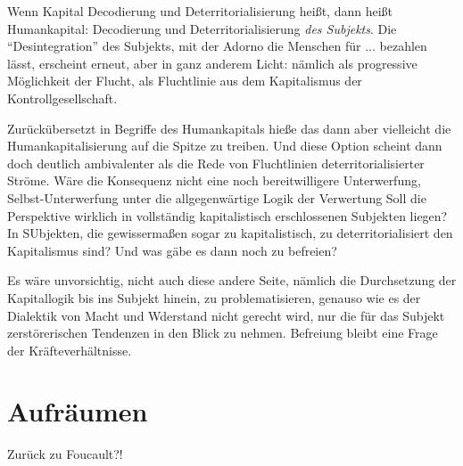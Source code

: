 \documentclass[12pt,
               DIV13,
               paper=a4,
               twoside=false,
               onehalfspacing,
               bibliography=totoc,
               toc=graduated,
               draft,
               ]{scrartcl}
\newcommand{\worries}[1]{\ifdraft{\textcolor{blue}{\texttt{(#1)}}}{}}
\begin{document}
Wenn Kapital Decodierung und Deterritorialisierung heißt, dann heißt
Humankapital: Decodierung und Deterritorialisierung \emph{des
Subjekts}. Die "`Desintegration"' des Subjekts, mit der Adorno die
Menschen für ... bezahlen lässt, erscheint erneut, aber in ganz
anderem Licht: nämlich als progressive Möglichkeit der Flucht, als
Fluchtlinie aus dem Kapitalismus der Kontrollgesellschaft.

Zurückübersetzt in Begriffe des Humankapitals hieße das dann aber
vielleicht die Humankapitalisierung auf die Spitze zu treiben. Und
diese Option scheint dann doch deutlich ambivalenter als die Rede von
Fluchtlinien deterritorialisierter Ströme. Wäre die Konsequenz nicht
eine noch bereitwilligere Unterwerfung, Selbst-Unterwerfung unter die
allgegenwärtige Logik der Verwertung Soll die Perspektive wirklich in
vollständig kapitalistisch erschlossenen Subjekten liegen? In
SUbjekten, die gewissermaßen sogar zu kapitalistisch, zu
deterritorialisiert den Kapitalismus sind? Und was gäbe es dann noch
zu befreien? \worries{"`vorsubjektive Einheiten"'}

Es wäre unvorsichtig, nicht auch diese andere Seite, nämlich die
Durchsetzung der Kapitallogik bis ins Subjekt hinein, zu
problematisieren, genauso wie es der Dialektik von Macht und Wderstand
nicht gerecht wird, nur die für das Subjekt zerstörerischen Tendenzen
in den Blick zu nehmen. Befreiung bleibt eine Frage der
Kräfteverhältnisse.


\section{Aufräumen}

Zurück zu Foucault?!


\newpage
\nocite{*}
\printshorthands
\printbibliography
\end{document}

